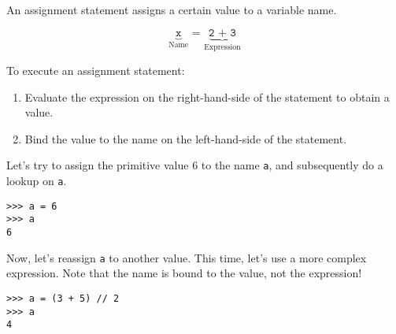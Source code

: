 An assignment statement assigns a certain value to a variable name.

\begin{blocksection}
\begin{equation*}
    \underbrace{\texttt{x}}_\text{Name}
    \texttt{ = }
    \underbrace{\texttt{2 + 3}}_\text{Expression}
\end{equation*}
\end{blocksection}

\begin{blocksection}
To execute an assignment statement:
\begin{enumerate}
\item Evaluate the expression on the right-hand-side of the statement to obtain
a value.
\item Bind the value to the name on the left-hand-side of the statement.
\end{enumerate}
\end{blocksection}

Let's try to assign the primitive value 6 to the name \texttt{a}, and subsequently
do a lookup on \texttt{a}.

\begin{lstlisting}
>>> a = 6
>>> a
6
\end{lstlisting}

Now, let's reassign \texttt{a} to another value. This time, let's use a more
complex expression. Note that the name is bound to the value, not the
expression!

\begin{lstlisting}
>>> a = (3 + 5) // 2
>>> a
4
\end{lstlisting}
